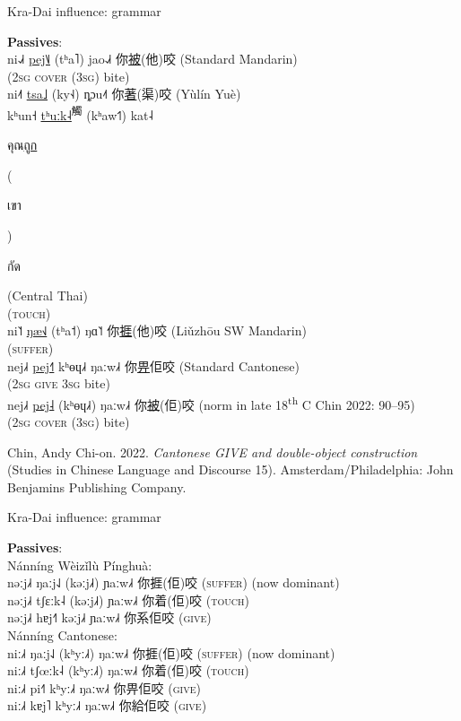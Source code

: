 \documentclass{beamer}
\begin{document}
\begin{frame}[fragile]{Kra-Dai influence: grammar}

{\small
\textbf{Passives}:\\
\medskip
ni˨˩˧ \underline{pej˥˩} (tʰa˥) jao˨˩˧ 你\underline{被}(他)咬 (Standard Mandarin)\\
(\textsc{2sg} \textsc{cover} (\textsc{3sg}) bite)\\
\medskip
ni˨˦ \underline{tsa˩} (ky˧˨) ȵɔu˨˦ 你\underline{著}(渠)咬 (Yùlín Yuè)\\
kʰun˧ \underline{tʰuːk˨}\textsuperscript{觸} (kʰaw˦˥) kat˨ \begin{thai}คุณ\underline{ถูก}\end{thai}(\begin{thai}เขา\end{thai})\begin{thai}กัด\end{thai} (Central Thai)\\
(\textsc{touch})\\
\medskip
ni˥˦ \underline{ŋæ˧˩} (tʰa˦) ŋɑ˥˦ 你\underline{捱}(他)咬 (Liǔzhōu SW Mandarin)\\
(\textsc{suffer})\\
\medskip
nej˩˧ \underline{pej˧˥} kʰɵɥ˩˧ ŋaːw˩˧ 你\underline{畀}佢咬 (Standard Cantonese)\\
(\textsc{2sg} \textsc{give} \textsc{3sg} bite)\\
nej˩˧ \underline{pej˨} (kʰɵɥ˩˧) ŋaːw˩˧ 你\underline{被}(佢)咬 (norm in late 18\textsuperscript{th} C {\tiny Chin 2022: 90–95})\\
(\textsc{2sg} \textsc{cover} (\textsc{3sg}) bite)

}
\vfill {} {\tiny Chin, Andy Chi-on. 2022. \textit{Cantonese GIVE and double-object construction} (Studies in Chinese Language and Discourse 15). Amsterdam/Philadelphia: John Benjamins Publishing Company.}\par
\end{frame}

\begin{frame}[fragile]{Kra-Dai influence: grammar}

{\small
\textbf{Passives}:\\
\medskip
Nánníng Wèizǐlù Pínghuà:\\
\smallskip
nəːj˩˧ ŋaːj˨˩ (kəːj˩˧) ɲaːw˩˧ 你捱(佢)咬 (\textsc{suffer}) (now dominant)\\
nəːj˩˧ tʃɛːk˨ (kəːj˩˧) ɲaːw˩˧ 你着(佢)咬 (\textsc{touch})\\
nəːj˩˧ hɐj˧˥ kəːj˩˧ ɲaːw˩˧ 你系佢咬 (\textsc{give})\\
\medskip
Nánníng Cantonese:\\
\smallskip
niː˩˧ ŋaːj˨˩ (kʰyː˩˧) ŋaːw˩˧ 你捱(佢)咬 (\textsc{suffer}) (now dominant)\\
niː˩˧ tʃœːk˨ (kʰyː˩˧) ŋaːw˩˧ 你着(佢)咬 (\textsc{touch})\\
niː˩˧ pi˧˥ kʰyː˩˧ ŋaːw˩˧ 你畀佢咬 (\textsc{give})\\
niː˩˧ kɐj˥ kʰyː˩˧ ŋaːw˩˧ 你給佢咬 (\textsc{give})\\

}
\end{frame}
\end{document}
